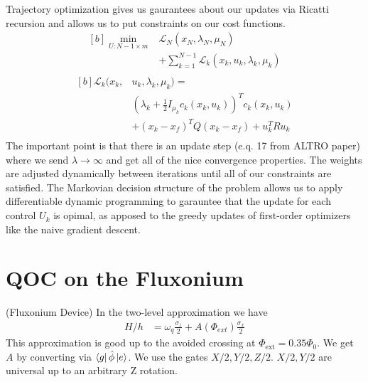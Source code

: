 \documentclass[
  amsfonts,
  amsmath,
  tbtags,
  amssymb,
  aps,
  nobibnotes,
  prl,
  twocolumn,
]{revtex4-2}
\begin{document}
Trajectory optimization gives us gaurantees
about our updates via Ricatti recursion
and allows us to put constraints on our cost functions.
\begin{equation}
\begin{aligned}[b]
  \min_{U:N-1 \times m} &\mathcal{L}_{N}(x_{N}, \lambda_{N}, \mu_{N})\\
  &+ \sum_{k = 1}^{N - 1} \mathcal{L}_{k}(x_{k}, u_{k}, \lambda_{k}, \mu_{k})\\
\end{aligned}
\end{equation}
\begin{equation}
\begin{aligned}[b]
  \mathcal{L}_{k}(x_{k}, &u_{k}, \lambda_{k}, \mu_{k}) =\\
  &(\lambda_{k} + \frac{1}{2}I_{\mu_{k}} c_{k}(x_{k}, u_{k}))^{T} c_{k}(x_{k}, u_{k})\\
  &+ (x_{k} - x_{f})^{T} Q (x_{k} - x_{f}) + u_{k}^{T} R u_{k}\\
\end{aligned}
\end{equation}
The important point is that there is an update step (e.q. 17 from ALTRO paper) where we send $\lambda \rightarrow \infty$
and get all of the nice convergence properties. The weights are adjusted dynamically between iterations until
all of our constraints are satisfied. The Markovian decision structure of the problem allows
us to apply differentiable dynamic programming to garauntee that the update for each control $U_{k}$ is
opimal, as apposed to the greedy updates of first-order optimizers like the naive gradient descent.



\section{QOC on the Fluxonium}
(Fluxonium Device) In the two-level
approximation we have
\begin{align}
  H/h &= \omega_{q} \frac{\sigma_{z}}{2} + A(\Phi_{ext}) \frac{\sigma_{x}}{2}
\end{align}
This approximation is good up to the avoided crossing at $\Phi_{\textrm{ext}} = 0.35 \Phi_{0}$. We get $A$
by converting via $\bra{g} \hat{\phi} \ket{e}$.
We use the gates $X/2, Y/2, Z/2$. $X/2, Y/2$ are universal
up to an arbitrary Z rotation.
\end{document}
